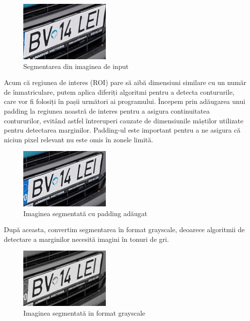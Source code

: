 \documentclass[a4paper,12pt]{report}
\begin{document}
\begin{figure}[h]
    \centering
    \includegraphics[width=0.4\textwidth]{images/color_roi.jpg}
    \caption{Segmentarea din imaginea de input}
\end{figure}
\FloatBarrier

Acum că regiunea de interes (ROI) pare să aibă dimensiuni similare cu un număr de înmatriculare, putem aplica diferiți algoritmi pentru a detecta contururile, care vor fi folosiți în pașii următori ai programului. Începem prin adăugarea unui padding la regiunea noastră de interes pentru a asigura continuitatea contururilor, evitând astfel întreruperi cauzate de dimensiunile măștilor utilizate pentru detectarea marginilor. Padding-ul este important pentru a ne asigura că niciun pixel relevant nu este omis în zonele limită.

\begin{figure}[h]
    \centering
    \includegraphics[width=0.4\textwidth]{images/padded_roi.jpg}
    \caption{Imaginea segmentată cu padding adăugat}
\end{figure}
\FloatBarrier

După aceasta, convertim segmentarea în format grayscale, deoarece algoritmii de detectare a marginilor necesită imagini în tonuri de gri.

\begin{figure}[h]
    \centering
    \includegraphics[width=0.4\textwidth]{images/gray_roi.jpg}
    \caption{Imaginea segmentată in format grayscale}
\end{figure}
\FloatBarrier
\end{document}
